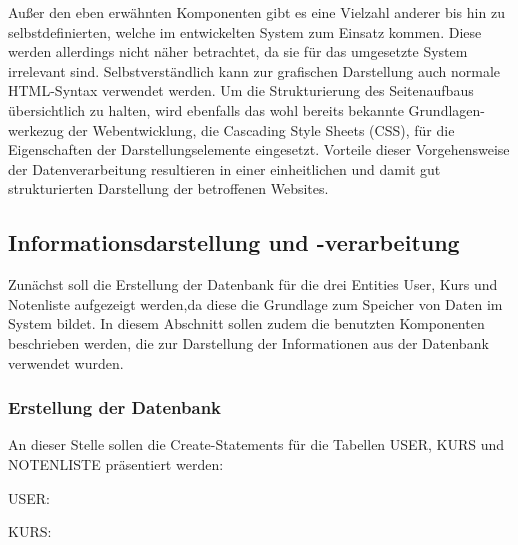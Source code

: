 Außer den eben erwähnten Komponenten gibt es eine Vielzahl anderer bis hin zu selbstdefinierten, welche im entwickelten System zum Einsatz kommen. Diese werden allerdings nicht näher betrachtet, da sie für das umgesetzte System irrelevant sind. Selbstverständlich kann zur grafischen Darstellung auch normale \ac{HTML}-Syntax verwendet werden.
Um die Strukturierung des Seitenaufbaus übersichtlich zu halten, wird ebenfalls das wohl bereits bekannte Grundlagen-werkezug der Webentwicklung, die \gls{Cascading Style Sheets} (CSS), für die Eigenschaften der Darstellungselemente eingesetzt.
Vorteile dieser Vorgehensweise der Datenverarbeitung resultieren in einer einheitlichen und damit gut strukturierten Darstellung der betroffenen Websites.

\subsection{Informationsdarstellung und -verarbeitung}

Zunächst soll die Erstellung der Datenbank für die drei Entities User, Kurs und Notenliste aufgezeigt werden,da diese die Grundlage zum Speicher von Daten im System bildet.
In diesem Abschnitt sollen zudem die benutzten Komponenten beschrieben werden, die zur Darstellung der Informationen aus der Datenbank verwendet wurden.

\subsubsection{Erstellung der Datenbank}

An dieser Stelle sollen die Create-Statements für die Tabellen USER, KURS und NOTENLISTE präsentiert werden:

USER:
	

KURS:
	

